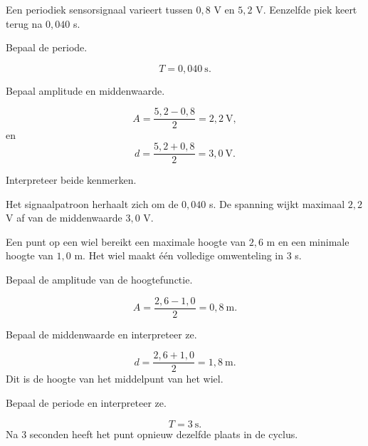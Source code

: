\documentclass{ximera}
\begin{document}
\begin{oefening}[Sensorsignaal]{\oefU\ESS}

Een periodiek sensorsignaal varieert tussen \(0{,}8\) V en \(5{,}2\) V.
Eenzelfde piek keert terug na \(0{,}040\) s.

\begin{question}
Bepaal de periode.
\begin{oplossing}
\[
T=0{,}040\ \mathrm{s}.
\]
\end{oplossing}
\end{question}

\begin{question}
Bepaal amplitude en middenwaarde.
\begin{oplossing}
\[
A=\frac{5{,}2-0{,}8}{2}=2{,}2\ \mathrm V,
\]
en
\[
d=\frac{5{,}2+0{,}8}{2}=3{,}0\ \mathrm V.
\]
\end{oplossing}
\end{question}

\begin{question}
Interpreteer beide kenmerken.
\begin{oplossing}
Het signaalpatroon herhaalt zich om de \(0{,}040\) s.
De spanning wijkt maximaal \(2{,}2\) V af van de middenwaarde \(3{,}0\) V.
\end{oplossing}
\end{question}
\end{oefening}

\begin{oefening}{\oefU\ESS}

Een punt op een wiel bereikt een maximale hoogte van \(2{,}6\) m en een minimale
hoogte van \(1{,}0\) m. Het wiel maakt één volledige omwenteling in \(3\) s.

\begin{question}
Bepaal de amplitude van de hoogtefunctie.
\begin{oplossing}
\[
A=\frac{2{,}6-1{,}0}{2}=0{,}8\ \mathrm m.
\]
\end{oplossing}
\end{question}

\begin{question}
Bepaal de middenwaarde en interpreteer ze.
\begin{oplossing}
\[
d=\frac{2{,}6+1{,}0}{2}=1{,}8\ \mathrm m.
\]
Dit is de hoogte van het middelpunt van het wiel.
\end{oplossing}
\end{question}

\begin{question}
Bepaal de periode en interpreteer ze.
\begin{oplossing}
\[
T=3\ \mathrm s.
\]
Na \(3\) seconden heeft het punt opnieuw dezelfde plaats in de cyclus.
\end{oplossing}
\end{question}
\end{oefening}
\end{document}

